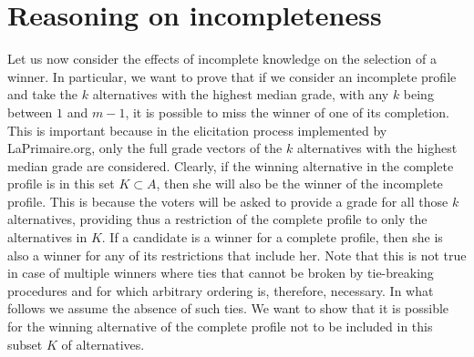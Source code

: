\section{Reasoning on incompleteness}
Let us now consider the effects of incomplete knowledge on the selection of a winner. In particular, we want to prove that if we consider an incomplete profile and take the $k$ alternatives with the highest median grade, with any $k$ being between $1$ and $m-1$, it is possible to miss the winner of one of its completion. 
This is important because in the elicitation process implemented by LaPrimaire.org, only the full grade vectors of the $k$ alternatives with the highest median grade are considered. Clearly, if the winning alternative in the complete profile is in this set $K \subset A$, then she will also be the winner of the incomplete profile. This is because the voters will be asked to provide a grade for all those $k$ alternatives, providing thus a restriction of the complete profile to only the alternatives in $K$. If a candidate is a winner for a complete profile, then she is also a winner for any of its restrictions that include her.
Note that this is not true in case of multiple winners where ties that cannot be broken by tie-breaking procedures and for which arbitrary ordering is, therefore, necessary. In what follows we assume the absence of such ties.
We want to show that it is possible for the winning alternative of the complete profile not to be included in this subset $K$ of alternatives.

